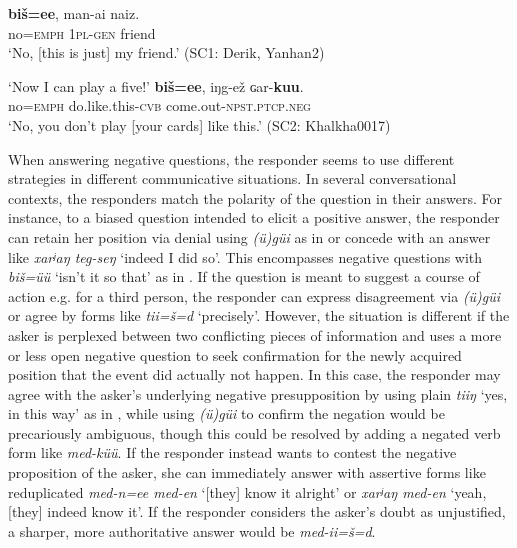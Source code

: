 \documentclass[output=paper,colorlinks,citecolor=brown,chinesefont]{langscibook}
\begin{document}
    \ex\label{ex:kha:53B}
        \gll \textbf{biš=ee}, man-ai naiz. \\
             no=\textsc{emph} \textsc{1pl-gen} friend \\
        \glt ‘No, [this is just] my friend.’ (SC1: Derik, Yanhan2)
    \z
\z 

\ea\label{ex:kha:54}
    \begin{xlist}
    \label{ex:kha:54a}
        \glt  ‘Now I can play a five!’
    \label{ex:kha:54b}
        \gll \textbf{biš=ee}, iŋg-ež ɢar-\textbf{kuu}. \\
         no=\textsc{emph} do.like.this-\textsc{cvb} come.out-\textsc{npst.ptcp.neg} \\
        \glt ‘No, you don’t play [your cards] like this.’ (SC2: Khalkha0017)
    \end{xlist}
\z  

When answering negative questions, the responder seems to use different strategies in different communicative situations. In several conversational contexts, the responders match the polarity of the question in their answers. For instance, to a biased question intended to elicit a positive answer, the responder can retain her position via denial using \textit{(ü)güi} as in  or concede with an answer like \textit{xarʲaŋ teg-seŋ} ‘indeed I did so’. This encompasses negative questions with \textit{biš=üü} ‘isn’t it so that’ as in . If the question is meant to suggest a course of action e.g. for a third person, the responder can express disagreement via \textit{(ü)güi} or agree by forms like \textit{tii=š=d} ‘precisely’. However, the situation is different if the asker is perplexed between two conflicting pieces of information and uses a more or less open negative question to seek confirmation for the newly acquired position that the event did actually not happen. In this case, the responder may agree with the asker’s underlying negative presupposition by using plain \textit{tiiŋ} ‘yes, in this way’ as in , while using \textit{(ü)güi} to confirm the negation would be precariously ambiguous, though this could be resolved by adding a negated verb form like \textit{med-küü}. If the responder instead wants to contest the negative proposition of the asker, she can immediately answer with assertive forms like reduplicated \textit{med-n=ee med-en} ‘[they] know it alright’ or \textit{xarʲaŋ med-en} ‘yeah, [they] indeed know it’. If the responder considers the asker’s doubt as unjustified, a sharper, more authoritative answer would be \textit{med-ii=š=d}.
\end{document}
